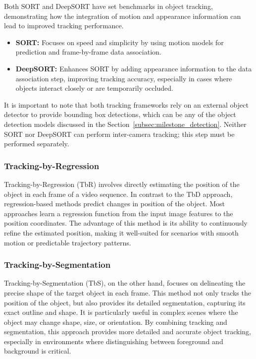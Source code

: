 Both SORT and DeepSORT have set benchmarks in object tracking, demonstrating how the integration of motion and appearance information can lead to improved tracking performance.

\begin{itemize}
	\item \textbf{SORT:} Focuses on speed and simplicity by using motion models for prediction and frame-by-frame data association.
	\item \textbf{DeepSORT:} Enhances SORT by adding appearance information to the data association step, improving tracking accuracy, especially in cases where objects interact closely or are temporarily occluded.
\end{itemize}

It is important to note that both tracking frameworks rely on an external object detector to provide bounding box detections, which can be any of the object detection models discussed in the Section~\ref{subsec:milestone_detection}. Neither SORT nor DeepSORT can perform inter-camera tracking; this step must be performed separately.

\subsubsection{Tracking-by-Regression}\label{subsubsec:tracking-by-regression}
Tracking-by-Regression (TbR) involves directly estimating the position of the object in each frame of a video sequence. In contrast to the TbD approach, regression-based methods predict changes in position of the object. Most approaches learn a regression function from the input image features to the position coordinates. The advantage of this method is its ability to continuously refine the estimated position, making it well-suited for scenarios with smooth motion or predictable trajectory patterns.

\subsubsection{Tracking-by-Segmentation}\label{subsubsec:tracking-by-segmentation}
Tracking-by-Segmentation (TbS), on the other hand, focuses on delineating the precise shape of the target object in each frame. This method not only tracks the position of the object, but also provides its detailed segmentation, capturing its exact outline and shape. It is particularly useful in complex scenes where the object may change shape, size, or orientation. By combining tracking and segmentation, this approach provides more detailed and accurate object tracking, especially in environments where distinguishing between foreground and background is critical.

